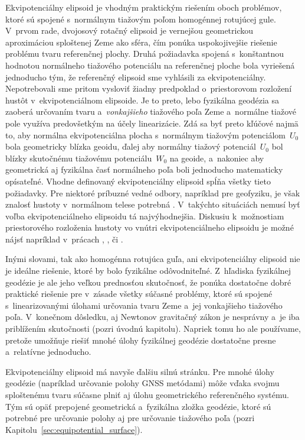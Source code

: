 \documentclass[a4paper, 12pt]{book}
\begin{document}
Ekvipotenciálny elipsoid je vhodným praktickým riešením oboch problémov, ktoré 
sú spojené s~normálnym tiažovým poľom homogénnej rotujúcej gule.  V~prvom rade, 
dvojosový rotačný elipsoid je vernejšou geometrickou aproximáciou sploštenej 
Zeme ako sféra, čím ponúka uspokojivejšie riešenie problému tvaru referenčnej 
plochy.  Druhá požiadavka spojená s~konštantnou hodnotou normálneho tiažového 
potenciálu na referenčnej ploche bola vyriešená jednoducho tým, že referenčný 
elipsoid sme vyhlásili za ekvipotenciálny.  Nepotrebovali sme pritom vysloviť 
žiadny predpoklad o~priestorovom rozložení hustôt v~ekvipotenciálnom elipsoide.  
Je to preto, lebo fyzikálna geodézia sa zaoberá určovaním tvaru 
a~\emph{vonkajšieho} tiažového poľa Zeme a~normálne tiažové pole využíva 
predovšetkým na účely linearizácie.  Zdá sa byť preto kľúčové najmä to, aby 
normálna ekvipotenciálna plocha s~normálnym tiažovým potenciálom~$U_0$ bola 
geometricky blízka geoidu, ďalej aby normálny tiažový potenciál~$U_0$ bol 
blízky skutočnému tiažovému potenciálu~$W_0$ na geoide, a~nakoniec aby 
geometrická aj fyzikálna časť normálneho poľa boli jednoducho matematicky 
opísateľné.  Vhodne definovaný ekvipotenciálny elipsoid spĺňa všetky tieto 
požiadavky.  Pre niektoré príbuzné vedné odbory, napríklad pre geofyziku, je 
však znalosť hustoty v~normálnom telese potrebná \parencite{Karcol2017}.  
V~takýchto situáciách nemusí byť voľba ekvipotenciálneho elipsoidu tá 
najvýhodnejšia.  Diskusiu k~možnostiam priestorového rozloženia hustoty vo 
vnútri ekvipotenciálneho elipsoidu je možné nájsť napríklad v~prácach 
\textcite{MoritzTheFigureOfTheEarth}, \textcite{TorgeGeodesy}, 
\textcite{Conway2000} či \textcite{Karcol2017}.

Inými slovami, tak ako homogénna rotujúca guľa, ani ekvipotenciálny elipsoid 
nie je ideálne riešenie, ktoré by bolo fyzikálne odôvodniteľné.  Z~hľadiska 
fyzikálnej geodézie je ale jeho veľkou prednosťou skutočnosť, že ponúka 
dostatočne dobré praktické riešenie pre v~zásade všetky súčasné problémy, ktoré 
sú spojené s~linearizovanými úlohami určovania tvaru Zeme a~jej vonkajšieho 
tiažového poľa.  V~konečnom dôsledku, aj Newtonov gravitačný zákon je nesprávny 
a~je iba priblížením skutočnosti (pozri úvodnú kapitolu).  Napriek tomu ho ale 
používame, pretože umožňuje riešiť mnohé úlohy fyzikálnej geodézie dostatočne 
presne a~relatívne jednoducho.

Ekvipotenciálny elipsoid má navyše ďalšiu silnú stránku.  Pre mnohé úlohy 
geodézie (napríklad určovanie polohy GNSS metódami) môže vďaka svojmu 
sploštenému tvaru súčasne plniť aj úlohu geometrického referenčného systému.  
Tým sú opäť prepojené geometrická a~fyzikálna zložka geodézie, ktoré sú 
potrebné pre určovanie polohy aj pre určovanie tiažového poľa (pozri 
Kapitolu~\ref{sec:equipotential_surface}).
\end{document}
